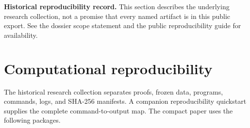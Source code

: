 \noindent\textbf{Historical reproducibility record.} This section describes the underlying research collection, not a promise that every named artifact is in this public export. See the dossier scope statement and the public reproducibility guide for availability.
\medskip

\section{Computational reproducibility}\label{sec:reproducibility}

The historical research collection separates proofs, frozen data, programs, commands, logs, and
SHA-256 manifests.  A companion reproducibility quickstart supplies the
complete command-to-output map.  The compact paper uses the following
packages.


